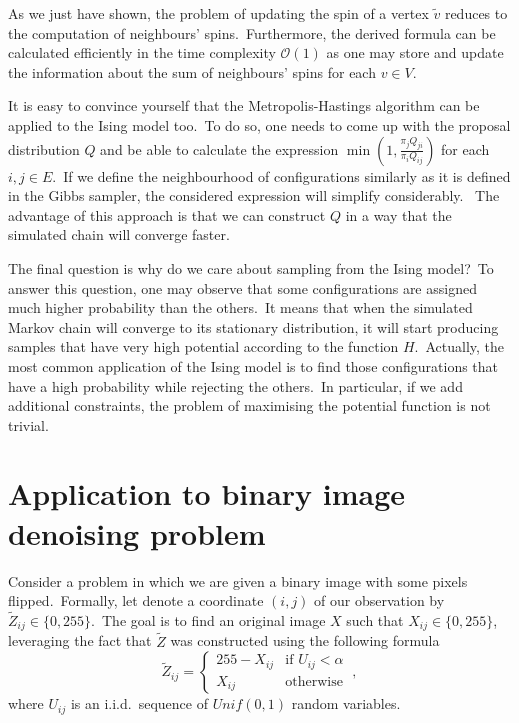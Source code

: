 \documentclass[shortabstract, english, lic]{iithesis}
\theoremstyle{default_theorem_style}\newtheorem{theorem}{Theorem}
\theoremstyle{default_theorem_style}\newtheorem{definition}{Definition}
\begin{document}
\noindent As we just have shown, the problem of updating the spin of a vertex $\tilde{v}$ reduces to the computation of
neighbours' spins.\ Furthermore, the derived formula can be calculated efficiently in the time
complexity $\mathcal{O}(1)$ as one may store and update the information about the sum of neighbours'
spins for each $v \in V$.\newline

\noindent It is easy to convince yourself that the Metropolis-Hastings algorithm can be applied to the Ising model
too.\ To do so, one needs to come up with the proposal distribution $Q$ and be able to calculate the expression
$\min{(1, \frac{\pi_j Q_{ji}}{\pi_i Q_{ij}})}$ for each $i, j \in E$.\ If we define the neighbourhood of configurations
similarly as it is defined in the Gibbs sampler, the considered expression will simplify considerably. \ The
advantage of this approach is that we can construct $Q$ in a way that the simulated chain will converge faster.\newline

\noindent The final question is why do we care about sampling from the Ising model?\ To answer this question, one may
observe that some configurations are assigned much higher probability than the others.\ It means that when the simulated
Markov chain will converge to its stationary distribution, it will start producing samples that have very high
potential according to the function $H$.\ Actually, the most common application of the Ising model is to find
those configurations that have a high probability while rejecting the others.\ In particular, if we add
additional constraints, the problem of maximising the potential function is not trivial.

\section{Application to binary image denoising problem} \label{sec:binary_images_problem}

Consider a problem in which we are given a binary image with some pixels flipped.\ Formally, let denote a coordinate
$(i, j)$ of our observation by $\tilde{Z}_{ij} \in \{0, 255\}$.\ The goal is to find an original image $X$ such that
$X_{ij} \in \{0, 255\}$, leveraging the fact that $\tilde{Z}$ was constructed using the following formula
$$
\tilde{Z}_{ij} =
\begin{cases}
  255 - X_{ij} &\text{if $U_{ij} < \alpha$}\\
  X_{ij} &\text{otherwise}
\end{cases}\ ,
$$
where $U_{ij}$ is an i.i.d.\ sequence of $Unif(0, 1)$ random variables.\newline
\end{document}
